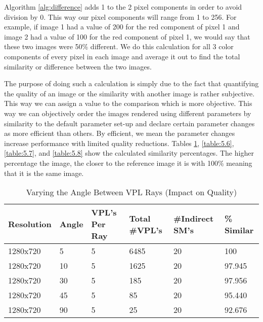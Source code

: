 Algorithm \ref{alg:difference} adds 1 to the 2 pixel components in order to avoid division by 0.  This way our pixel components will range from 1 to 256.  For example, if image 1 had a value of 200 for the red component of pixel 1 and image 2 had a value of 100 for the red component of pixel 1, we would say that these two images were 50\% different.  We do this calculation for all 3 color components of every pixel in each image and average it out to find the total similarity or difference between the two images.

The purpose of doing such a calculation is simply due to the fact that quantifying the quality of an image or  the similarity with another image is rather subjective.  This way we can assign a value to the comparison which is more objective.  This way we can objectively order the images rendered using different parameters by similarity to the default parameter set-up and declare certain parameter changes as more efficient than others.  By efficient, we mean the parameter changes increase performance with limited quality reductions.  Tables \ref{table:5.5}, \ref{table:5.6}, \ref{table:5.7}, and \ref{table:5.8} show the calculated similarity percentages.  The higher percentage the image, the closer to the reference image it is with 100\% meaning that it is the same image.


\begin{table}[h!]
	\caption{Varying the Angle Between VPL Rays (Impact on Quality)}
	\begin{center}
	    \begin{tabular}{ | l | l | l | l | l | l |}
	    \hline
	    Resolution & Angle & VPL's Per Ray & Total \#VPL's & \#Indirect SM's & \% Similar\\ \hline
	    1280x720 & 5 & 5 & 6485 & 20 & 100\\ \hline
	    1280x720 & 10 & 5 & 1625 & 20 & 97.945\\ \hline
	    1280x720 & 30 & 5 & 185 & 20 & 97.956\\ \hline
	    1280x720 & 45 & 5 & 85 & 20 & 95.440\\ \hline
	    1280x720 & 90 & 5 & 25 & 20 & 92.676\\ \hline
	    \end{tabular}
	\end{center}
	\label{table:5.5}
\end{table}

